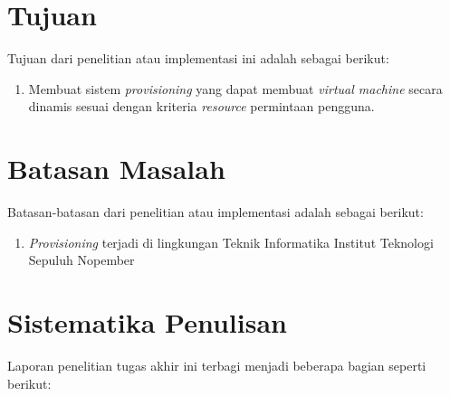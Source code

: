 \section{Tujuan}
\label{sec:Tujuan}

Tujuan dari penelitian atau implementasi ini adalah sebagai berikut:

\begin{enumerate}[nolistsep]

  \item Membuat sistem \emph{provisioning} yang dapat membuat \emph{virtual machine}
    secara dinamis sesuai dengan kriteria \emph{resource} permintaan pengguna.

\end{enumerate}

\section{Batasan Masalah}
\label{sec:batasanmasalah}

Batasan-batasan dari penelitian atau implementasi adalah sebagai berikut:

\begin{enumerate}[nolistsep]

  \item \emph{Provisioning} terjadi di lingkungan Teknik Informatika Institut
    Teknologi Sepuluh Nopember

\end{enumerate}

\section{Sistematika Penulisan}
\label{sec:sistematikapenulisan}

Laporan penelitian tugas akhir ini terbagi menjadi beberapa bagian seperti
berikut:

